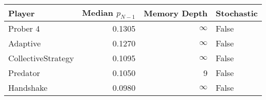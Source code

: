 \begin{tabular}{lrrl}
\toprule
             Player &  Median $p_{N-1}$ &  Memory Depth & Stochastic \\
\midrule
           Prober 4 &            0.1305 &            \(\infty\) &      False \\
           Adaptive &            0.1270 &            \(\infty\) &      False \\
 CollectiveStrategy &            0.1095 &            \(\infty\) &      False \\
           Predator &            0.1050 &             9 &      False \\
          Handshake &            0.0980 &            \(\infty\) &      False \\
\bottomrule
\end{tabular}
